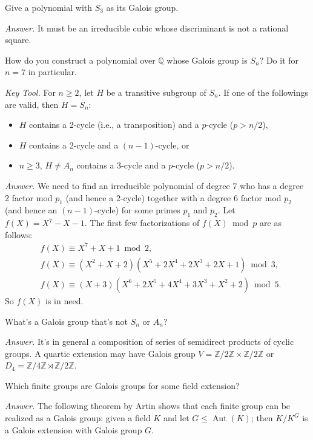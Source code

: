 \documentclass{mathproblems}
\newcommand\Q{\mathbb{Q}}
\newcommand\Z{\mathbb{Z}}
\DeclareMathOperator{\Aut}{Aut}
\begin{document}
\begin{questions}
\miquestion
{\color{blue} Give a polynomial with $S_{3}$ as its Galois group.}

\textit{Answer.}
It must be an irreducible cubic whose discriminant is not a rational square.

\miquestion
{\color{blue} How do you construct a polynomial over $\Q$ whose Galois group is $S_{n}$? Do it for $n=7$ in particular.}

{\color{violet}
\textit{Key Tool.} For $n\geqslant 2$, let $H$ be a transitive subgroup of $S_n$. If one of the followings are valid, then $H=S_n$: \vspace{-4pt}
\begin{itemize}
    \item $H$ contains a 2-cycle (i.e., a transposition) and a $p$-cycle ($p>n/2$),
    \item $H$ contains a 2-cycle and a $(n-1)$-cycle, or
    \item $n\geqslant 3$, $H\neq A_n$ contains a 3-cycle and a $p$-cycle ($p>n/2$).
\end{itemize} \vspace{-4pt}
}

\textit{Answer.} We need to find an irreducible polynomial of degree 7 who has a degree 2 factor mod $p_1$ (and hence a 2-cycle) together with a degree 6 factor mod $p_2$ (and hence an $(n-1)$-cycle) for some primes $p_1$ and $p_2$. Let $f(X)=X^{7}-X-1$. The first few factorizations of $f(X) \bmod p$ are as follows:
$$
\begin{aligned}
&f(X) \equiv X^{7}+X+1 \bmod 2, \\
&f(X) \equiv(X^{2}+X+2)(X^{5}+2 X^{4}+2 X^{3}+2 X+1) \bmod 3, \\
&f(X) \equiv(X+3)(X^{6}+2 X^{5}+4 X^{4}+3 X^{3}+X^{2}+2) \bmod 5.
\end{aligned}
$$
So $f(X)$ is in need.


\miquestion
{\color{blue} What's a Galois group that's not $S_{n}$ or $A_{n}$?}

\textit{Answer.} It's in general a composition of series of semidirect products of cyclic groups. A quartic extension may have Galois group $V=\Z/2\Z\times \Z/2\Z$ or $D_4= \Z/4\Z\rtimes \Z/2\Z$.

\miquestion
{\color{blue} Which finite groups are Galois groups for some field extension?}

\textit{Answer.} The following theorem by Artin shows that each finite group can be realized as a Galois group: given a field $K$ and let $G\leqslant \Aut(K)$; then $K/K^G$ is a Galois extension with Galois group $G$.


\end{questions}
\end{document}
